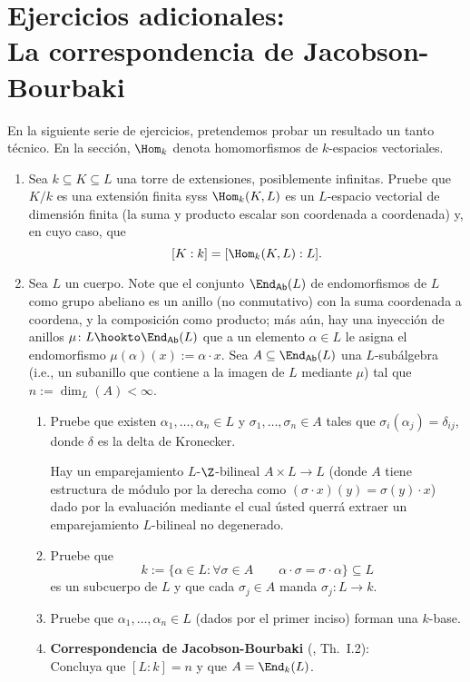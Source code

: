 \documentclass[11pt, reqno]{amsart}
\begin{document}
\section{Ejercicios adicionales:\\La correspondencia de Jacobson-Bourbaki}
En la siguiente serie de ejercicios, pretendemos probar un resultado un tanto técnico.
En la sección, $\Hom_k$ denota homomorfismos de $k$-espacios vectoriales.
\begin{enumerate}[resume]
	\item Sea $k \subseteq K \subseteq L$ una torre de extensiones, posiblemente infinitas.
		Pruebe que $K / k$ es una extensión finita syss $\Hom_k(K, L)$ es un $L$-espacio vectorial de dimensión finita (la
		suma y producto escalar son coordenada a coordenada) y, en cuyo caso, que
		\[
			[ K : k ] = [ \Hom_k(K, L) : L ].
		\]

	\item\lookst
		Sea $L$ un cuerpo.
		Note que el conjunto $\End_{\mathsf{Ab}}(L)$ de endomorfismos de $L$ como grupo abeliano es un anillo (no
		conmutativo) con la suma coordenada a coordena, y la composición como producto;
		más aún, hay una inyección de anillos $\mu\colon L \hookto \End_{\mathsf{Ab}}(L)$ que a un elemento $\alpha \in
		L$ le asigna el endomorfismo $\mu(\alpha)(x) := \alpha\cdot x$.
		Sea $A \subseteq \End_{\mathsf{Ab}}(L)$ una $L$-subálgebra (i.e., un subanillo que contiene a la imagen de
		$L$ mediante $\mu$) tal que $n := \dim_L(A) < \infty$.
		\begin{enumerate}
			\item Pruebe que existen $\alpha_1, \dots, \alpha_n \in L$ y $\sigma_1, \dots, \sigma_n \in A$ tales que
				$\sigma_i(\alpha_j) = \delta_{ij}$, donde $\delta$ es la delta de Kronecker.

				\begin{hint}
					Hay un emparejamiento $L$-$\Z$-bilineal $A \times L \to L$ (donde $A$ tiene estructura de módulo por
					la derecha como $(\sigma\cdot x)(y) = \sigma(y)\cdot x$) dado por la evaluación mediante el
					cual ústed querrá extraer un emparejamiento $L$-bilineal no degenerado.
				\end{hint}

			\item Pruebe que
				\[
					k := \{ \alpha \in L : \forall \sigma \in A \qquad \alpha\cdot\sigma = \sigma\cdot\alpha \} \subseteq L
				\]
				es un subcuerpo de $L$ y que cada $\sigma_j \in A$ manda $\sigma_j \colon L \to k$.

			\item Pruebe que $\alpha_1, \dots, \alpha_n \in L$ (dados por el primer inciso) forman una $k$-base.

			\item\textbf{Correspondencia de Jacobson-Bourbaki} (\cite{jacobson:galois}, Th.~I.2):\\
				Concluya que $[L : k] = n$ y que $A = \End_k(L)$.
		\end{enumerate}
\end{enumerate}
\end{document}
